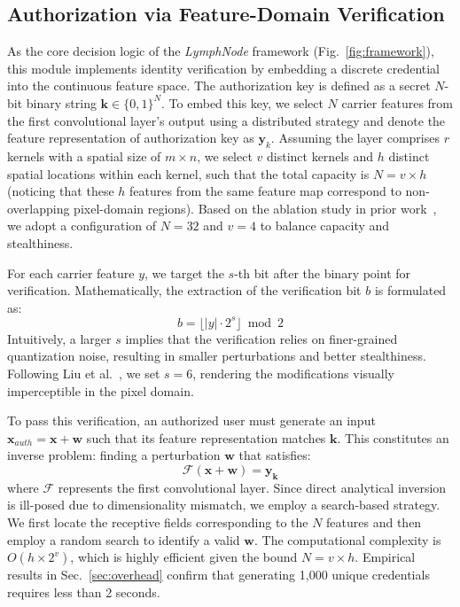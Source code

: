 \documentclass[conference]{IEEEtran}
\begin{document}
\subsection{Authorization via Feature-Domain Verification}
\label{sec:identify}

As the core decision logic of the \textit{LymphNode} framework (Fig.~\ref{fig:framework}), this module implements identity verification by embedding a discrete credential into the continuous feature space. The authorization key is defined as a secret $N$-bit binary string $\mathbf{k} \in \{0,1\}^N$. To embed this key, we select $N$ carrier features from the first convolutional layer's output using a distributed strategy and denote the feature representation of authorization key as $\mathbf{y}_k$. Assuming the layer comprises $r$ kernels with a spatial size of $m \times n$, we select $v$ distinct kernels and $h$ distinct spatial locations within each kernel, such that the total capacity is $N = v \times h$ (noticing that these $h$ features from the same feature map correspond to non-overlapping pixel-domain regions). Based on the ablation study in prior work~\cite{liu2022loneneuron}, we adopt a configuration of $N = 32$ and $v = 4$ to balance capacity and stealthiness. 

For each carrier feature $y$, we target the $s$-th bit after the binary point for verification. Mathematically, the extraction of the verification bit $b$ is formulated as:
\begin{equation}
b = \lfloor |y| \cdot 2^s \rfloor \bmod 2
\end{equation}
Intuitively, a larger $s$ implies that the verification relies on finer-grained quantization noise, resulting in smaller perturbations and better stealthiness. Following Liu et al.~\cite{liu2022loneneuron}, we set $s = 6$, rendering the modifications visually imperceptible in the pixel domain.

To pass this verification, an authorized user must generate an input $\mathbf{x}_{auth} = \mathbf{x} + \mathbf{w}$ such that its feature representation matches $\mathbf{k}$. This constitutes an inverse problem: finding a perturbation $\mathbf{w}$ that satisfies:
\begin{equation}
\label{eq:inverse}
    \mathcal{F}(\mathbf{x} + \mathbf{w}) = \mathbf{y}_{\mathbf{k}}
\end{equation}
where $\mathcal{F}$ represents the first convolutional layer. Since direct analytical inversion is ill-posed due to dimensionality mismatch, we employ a search-based strategy. We first locate the receptive fields corresponding to the $N$ features and then employ a random search to identify a valid $\mathbf{w}$. The computational complexity is $O(h \times 2^v)$, which is highly efficient given the bound $N = v \times h$. Empirical results in Sec.~\ref{sec:overhead} confirm that generating 1,000 unique credentials requires less than 2 seconds.
\end{document}
